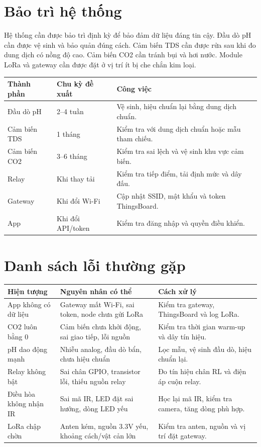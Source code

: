 \section{Bảo trì hệ thống}
Hệ thống cần được bảo trì định kỳ để bảo đảm dữ liệu đáng tin cậy. Đầu dò pH cần được vệ sinh và bảo quản đúng cách. Cảm biến TDS cần được rửa sau khi đo dung dịch có nồng độ cao. Cảm biến CO2 cần tránh bụi và hơi nước. Module LoRa và gateway cần được đặt ở vị trí ít bị che chắn kim loại.

\begin{longtable}{|p{4cm}|p{4cm}|p{5cm}|}
\hline
\textbf{Thành phần} & \textbf{Chu kỳ đề xuất} & \textbf{Công việc} \\
\hline
Đầu dò pH & 2--4 tuần & Vệ sinh, hiệu chuẩn lại bằng dung dịch chuẩn. \\
\hline
Cảm biến TDS & 1 tháng & Kiểm tra với dung dịch chuẩn hoặc mẫu tham chiếu. \\
\hline
Cảm biến CO2 & 3--6 tháng & Kiểm tra sai lệch và vệ sinh khu vực cảm biến. \\
\hline
Relay & Khi thay tải & Kiểm tra tiếp điểm, tải định mức và dây đấu. \\
\hline
Gateway & Khi đổi Wi-Fi & Cập nhật SSID, mật khẩu và token ThingsBoard. \\
\hline
App & Khi đổi API/token & Kiểm tra đăng nhập và quyền điều khiển. \\
\hline
\end{longtable}

\section{Danh sách lỗi thường gặp}
\begin{longtable}{|p{4cm}|p{4.5cm}|p{4.8cm}|}
\hline
\textbf{Hiện tượng} & \textbf{Nguyên nhân có thể} & \textbf{Cách xử lý} \\
\hline
App không có dữ liệu & Gateway mất Wi-Fi, sai token, node chưa gửi LoRa & Kiểm tra gateway, ThingsBoard và log LoRa. \\
\hline
CO2 luôn bằng 0 & Cảm biến chưa khởi động, sai giao tiếp, lỗi nguồn & Kiểm tra thời gian warm-up và dây tín hiệu. \\
\hline
pH dao động mạnh & Nhiễu analog, đầu dò bẩn, chưa hiệu chuẩn & Lọc mẫu, vệ sinh đầu dò, hiệu chuẩn lại. \\
\hline
Relay không bật & Sai chân GPIO, transistor lỗi, thiếu nguồn relay & Đo tín hiệu chân RL và điện áp cuộn relay. \\
\hline
Điều hòa không nhận IR & Sai mã IR, LED đặt sai hướng, dòng LED yếu & Học lại mã IR, kiểm tra camera, tăng dòng phù hợp. \\
\hline
LoRa chập chờn & Anten kém, nguồn 3.3V yếu, khoảng cách/vật cản lớn & Kiểm tra anten, nguồn và vị trí đặt gateway. \\
\hline
\end{longtable}

